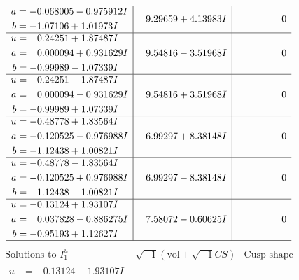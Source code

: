 \documentclass[1p]{elsarticle_modified}
\theoremstyle{definition}
\newcommand{\I}{\sqrt{-1}}
\begin{document}
$$\begin{array}{c|c|c}
\begin{aligned}
a &= -0.068005 - 0.975912 I \\
b &= -1.07106 + 1.01973 I\end{aligned}
 & \phantom{-}9.29659 + 4.13983 I & \phantom{-0.000000 } 0 \\ \hline\begin{aligned}
u &= \phantom{-}0.24251 + 1.87487 I \\
a &= \phantom{-}0.000094 + 0.931629 I \\
b &= -0.99989 - 1.07339 I\end{aligned}
 & \phantom{-}9.54816 - 3.51968 I & \phantom{-0.000000 } 0 \\ \hline\begin{aligned}
u &= \phantom{-}0.24251 - 1.87487 I \\
a &= \phantom{-}0.000094 - 0.931629 I \\
b &= -0.99989 + 1.07339 I\end{aligned}
 & \phantom{-}9.54816 + 3.51968 I & \phantom{-0.000000 } 0 \\ \hline\begin{aligned}
u &= -0.48778 + 1.83564 I \\
a &= -0.120525 - 0.976988 I \\
b &= -1.12438 + 1.00821 I\end{aligned}
 & \phantom{-}6.99297 + 8.38148 I & \phantom{-0.000000 } 0 \\ \hline\begin{aligned}
u &= -0.48778 - 1.83564 I \\
a &= -0.120525 + 0.976988 I \\
b &= -1.12438 - 1.00821 I\end{aligned}
 & \phantom{-}6.99297 - 8.38148 I & \phantom{-0.000000 } 0 \\ \hline\begin{aligned}
u &= -0.13124 + 1.93107 I \\
a &= \phantom{-}0.037828 - 0.886275 I \\
b &= -0.95193 + 1.12627 I\end{aligned}
 & \phantom{-}7.58072 - 0.60625 I & \phantom{-0.000000 } 0\\
 \hline 
 \end{array}$$\newpage$$\begin{array}{c|c|c}  
\text{Solutions to }I^u_{1}& \I (\text{vol} + \sqrt{-1}CS) & \text{Cusp shape}\\
 \hline 
\begin{aligned}
u &= -0.13124 - 1.93107 I \\

\end{aligned}
\end{array}$$
\end{document}
